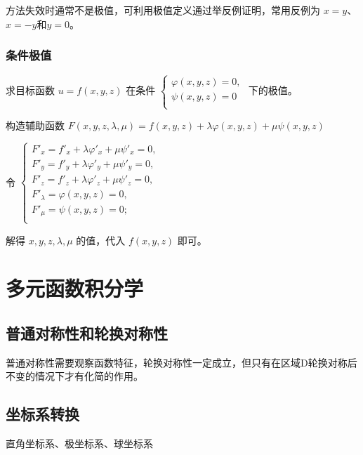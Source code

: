 ﻿\documentclass[a4paper,12pt,UTF8]{ctexart}
\begin{document}
    方法失效时通常不是极值，可利用极值定义通过举反例证明，常用反例为 \(x=y\)、\(x=-y\)和\(y=0\)。

    \subsubsection{条件极值}
    求目标函数 \(u=f(x,y,z)\) 在条件 
        \(\begin{cases}
            \varphi (x,y,z)=0,\\
            \psi (x,y,z)=0\\
        \end{cases}\) 
    下的极值。
        
    构造辅助函数 \(F(x,y,z,\lambda,\mu)=f(x,y,z)+\lambda \varphi (x,y,z)+\mu \psi (x,y,z)\)

    令
    \(\begin{cases}
        F'_x=f'_x+\lambda \varphi '_x + \mu \psi '_x=0,\\
        F'_y=f'_y+\lambda \varphi '_y + \mu \psi '_y=0,\\
        F'_z=f'_z+\lambda \varphi '_z + \mu \psi '_z=0,\\
        F'_\lambda=\varphi (x,y,z)=0,\\
        F'_\mu=\psi (x,y,z)=0;\\
    \end{cases} \)

    解得 \(x,y,z,\lambda,\mu\) 的值，代入 \(f(x,y,z)\) 即可。
     
    \section{多元函数积分学}

    \subsection{普通对称性和轮换对称性}
    普通对称性需要观察函数特征，轮换对称性一定成立，但只有在区域D轮换对称后不变的情况下才有化简的作用。

    \subsection{坐标系转换}
    直角坐标系、极坐标系、球坐标系
\end{document}
